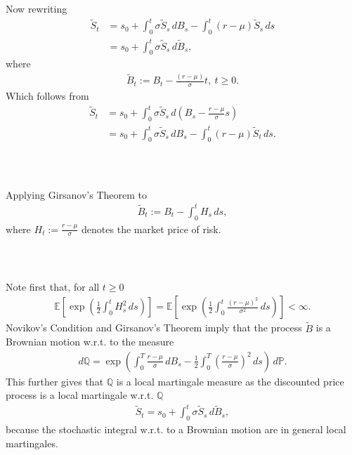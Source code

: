 \documentclass{beamer}
\numberwithin{equation}{section}
\newenvironment{frame2}{\begin{frame}\frametitle{{\normalsize \secname} \\ {\large \subsecname}}}{\end{frame}}
\begin{document}
\begin{frame2}
    Now rewriting
    \begin{align}
        \tilde{S}_t &= s_0 + \int_0^t \sigma \tilde{S}_s\, dB_s - \int_0^t (r - \mu)\tilde{S}_s\, ds \\
        &= s_0 + \int_0^t \sigma \tilde{S}_s \, d \tilde{B}_s,
    \end{align}
    where
    \begin{align}
        \tilde{B}_t := B_t - \frac{(r - \mu)}{\sigma}t, \ t \geq 0.
    \end{align}
    Which follows from
    \begin{align}
        \tilde{S}_t &= s_0 + \int_0^t \sigma \tilde{S}_s \, d\left(B_s - \frac{r - \mu}{\sigma}s\right) \\
        &= s_0 + \int_0^t \sigma \tilde{S}_s \, dB_s - \int_0^t (r - \mu)\tilde{S}_t \, ds.
    \end{align}
\end{frame2}

\begin{frame2}
    Applying Girsanov's Theorem to
    \begin{align}
        \tilde{B}_t := B_t - \int_0^t H_s \, ds,
    \end{align}
    where $H_t := \frac{r - \mu}{\sigma}$ denotes the market price of risk.
\end{frame2}

\begin{frame2}
    Note first that, for all $t \geq 0$
    \begin{align*}
        \mathbb{E}\left[\exp\left(\frac{1}{2}\int_0^t H_s^2 \, ds\right)\right] = \mathbb{E}\left[\exp\left(\frac{1}{2}\int_0^t \frac{(r - \mu)^2}{\sigma^2} \, ds\right)\right] < \infty.
    \end{align*}
    Novikov's Condition and Girsanov's Theorem imply that the process $\tilde{B}$ is a Brownian motion w.r.t.\! to the measure
    \begin{align}
        d\mathbb{Q} = \exp\left(\int_0^T \frac{r - \mu}{\sigma}\, dB_s - \frac{1}{2}\int_0^T \left(\frac{r - \mu}{\sigma}\right)^2 \, ds\right) \, d\mathbb{P}.
    \end{align}
    This further gives that $\mathbb{Q}$ is a local martingale measure as the discounted price process is a local martingale w.r.t. $\mathbb{Q}$
    \begin{align}
        \tilde{S}_t = s_0 + \int_0^t\sigma\tilde{S}_s \, d\tilde{B}_s,
    \end{align}
    because the stochastic integral w.r.t.\! to a Brownian motion are in general local martingales. 
\end{frame2}
\end{document}
